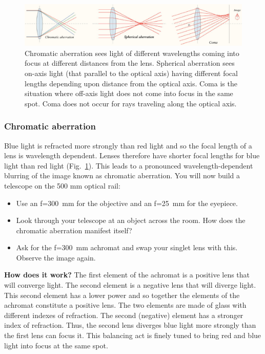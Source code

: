 \documentclass[a4paper]{report}
\begin{document}
\begin{figure}[h]
\center
\includegraphics[width=6in]{aberrations.eps}
\caption{ 
Chromatic aberration sees light of different wavelengths coming into focus at different distances from the lens.
Spherical aberration sees on-axis light (that parallel to the optical axis) having different focal lengths depending upon distance from the optical axis. 
Coma is the situation where off-axis light does not come into focus in the same spot. Coma does not occur for rays traveling along the optical axis.}
\label{fig:aberrations}
\end{figure}


\clearpage

\subsubsection{Chromatic aberration}
Blue light is refracted more strongly than red light and so the focal length of a lens is wavelength dependent. 
Lenses therefore have shorter focal lengths for blue light than red light (Fig.~\ref{fig:aberrations}).
This leads to a pronounced wavelength-dependent blurring of the image known as chromatic aberration. 
You will now build a telescope on the 500 mm optical rail:
\begin{itemize}
\item Use an f=300~mm for the objective and an f=25~mm for the eyepiece. 
\item Look through your telescope at an object across the room. How does the chromatic aberration manifest itself?
\item Ask for the f=300~mm achromat and swap your singlet lens with this. Observe the image again.
\end{itemize}

\textbf{How does it work?} 
The first element of the achromat is a positive lens that will converge light. 
The second element is a negative lens that will diverge light.
This second element has a lower power and so together the elements of the achromat constitute a positive lens. 
The two elements are made of glass with different indexes of refraction. 
The second (negative) element has a stronger index of refraction. 
Thus, the second lens diverges blue light more strongly than the first lens can focus it.
This balancing act is finely tuned to bring red and blue light into focus at the same spot.
\end{document}
